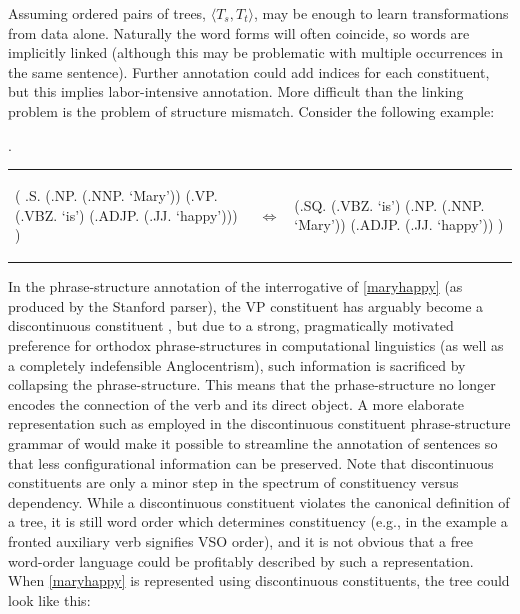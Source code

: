 \documentclass[a4paper]{article}
\theoremstyle{definition}
\begin{document}
Assuming ordered pairs of trees, $\langle T_{\mathit{s}},
T_{\mathit{t}} \rangle $, may be enough to learn transformations
from data alone. Naturally the word forms will often coincide, so words are
implicitly linked (although this may be problematic with multiple occurrences
in the same sentence). Further annotation could add indices for each
constituent, but this implies labor-intensive annotation. More difficult than
the linking problem is the problem of structure mismatch. Consider the following
example:

\ex. \label{maryhappy}

\begin{tabular}{lll}
\begin{parsetree}
( .S.
    (.NP. (.NNP. `Mary'))
    (.VP. (.VBZ. `is')
      (.ADJP. (.JJ. `happy')))
)
\end{parsetree}
& $\iff$ &
\begin{parsetree}
  (.SQ. 
    (.VBZ. `is')
    (.NP. (.NNP. `Mary'))
    (.ADJP. (.JJ. `happy'))
    )
\end{parsetree}
\end{tabular}
\vspace{1em}

In the phrase-structure annotation of the interrogative of \ref{maryhappy} (as produced
by the Stanford parser), the \textsc{VP} constituent has arguably become a
discontinuous constituent \cite{Ha}, but due to a strong, pragmatically
motivated preference for orthodox phrase-structures in computational linguistics (as
well as a completely indefensible Anglocentrism), such
information is sacrificed by collapsing the phrase-structure. This means that
the prhase-structure no longer encodes the connection of the verb and its
direct object. A more elaborate representation such as employed in the discontinuous
constituent phrase-structure grammar of \cite{Ha} would make it possible to streamline
the annotation of sentences so that less configurational information can be preserved.
Note that discontinuous constituents are only a minor step in the spectrum of
constituency versus dependency. While a discontinuous constituent violates the
canonical definition of a tree, it is still word order which determines constituency
(e.g., in the example a fronted auxiliary verb signifies VSO order),
and it is not obvious that a free word-order language could be profitably
described by such a representation. When \ref{maryhappy} is represented using
discontinuous constituents, the tree could look like this:
\end{document}
